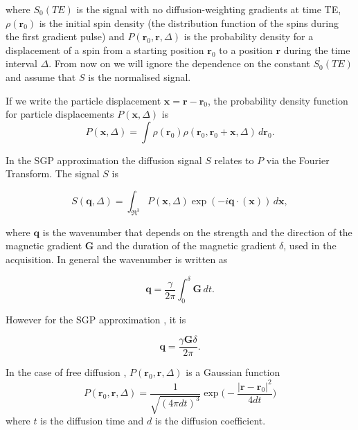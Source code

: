 where $S_{0}(TE)$ is the  signal with no diffusion-weighting gradients at time TE, $\rho(\textbf{r}_{0})$ is the initial spin density (the distribution function of the spins during the first gradient pulse)
and $P(\textbf{r}_{0},\textbf{r},\Delta)$ is the probability density for a displacement of a spin from a starting position $\textbf{r}_{0}$ to a position $\textbf{r}$ during the
time interval $\Delta$. From now on we will ignore the dependence on the constant $S_{0}(TE)$ and assume that $S$ is the normalised signal.

If we write the particle displacement $\textbf{x} = \textbf{r}-\textbf{r}_{0}$, the probability density function for particle  displacements  $P(\textbf{x},\Delta)$ is
\begin{equation}
P(\textbf{x},\Delta) = \int\rho(\textbf{r}_{0})\rho(\textbf{r}_{0},\textbf{r}_{0} + \textbf{x}, \Delta)\,d\textbf{r}_{0}.      %
\end{equation}

In the SGP approximation the diffusion signal $S$ relates to $P$ via the Fourier Transform. The signal $S$ is

\begin{equation}
S(\textbf{q},\Delta)=\int_{\Re^3}P(\textbf{x},\Delta)\exp(-i\textbf{q}\cdot(\textbf{x}))\,d\textbf{x},
\label{fourier}
\end{equation}

where $\textbf{q}$ is the wavenumber that depends on the strength and the direction of the magnetic gradient $\textbf{G}$ and the duration of the magnetic gradient $\delta$, used in the acquisition. In general the wavenumber is written as

\begin{equation}
\textbf{q}=\frac{\gamma}{2\pi}\int^\delta_0 \textbf{G}\,dt.
\label{q}
\end{equation}

However for the SGP approximation  \cite{Price1}, it is

 \begin{equation}
\textbf{q}=\frac{\gamma \textbf{G}\delta}{2\pi}.
\label{qsgp}
\end{equation}


In the case of free diffusion , $P(\textbf{r}_{0},\textbf{r},\Delta)$ is a Gaussian function
\begin{equation}
P(\textbf{r}_{0},\textbf{r},\Delta) =  \frac{1}{\sqrt{(4\pi
dt)^3}}\exp\bigg(-\frac{|\textbf{r}-\textbf{r}_{0}|^{2}}{4dt}\bigg)
\label{Gaussian}
\end{equation}
where $t$ is the diffusion time and $d$ is the diffusion coefficient.


